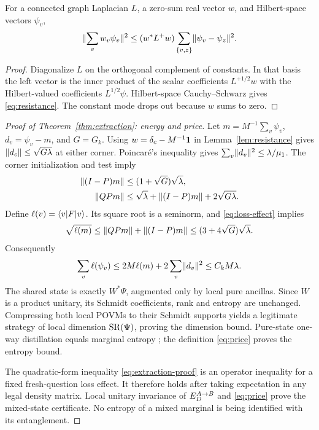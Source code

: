 \begin{lemma}\label{lem:resistance}
For a connected graph Laplacian $L$, a zero-sum real vector $w$,
and Hilbert-space vectors $\psi_v$,
\begin{equation}\label{eq:resistance}
 \lVert\sum_vw_v\psi_v\rVert^2\leq(w^*L^+w)
          \sum_{\{v,z\}}\lVert\psi_v-\psi_z\rVert^2.
\end{equation}
\end{lemma}
\begin{proof}
Diagonalize $L$ on the orthogonal complement of constants. In that
basis the left vector is the inner product of the scalar coefficients
$L^{+1/2}w$ with the Hilbert-valued coefficients $L^{1/2}\psi$.
Hilbert-space Cauchy--Schwarz gives \eqref{eq:resistance}. The constant
mode drops out because $w$ sums to zero.
\end{proof}

\begin{proof}[Proof of Theorem~\ref{thm:extraction}: energy and price]
Let $m=M^{-1}\sum_v\psi_v$, $d_v=\psi_v-m$, and $G=G_k$.
Using $w=\delta_c-M^{-1}\mathbf 1$ in Lemma~\ref{lem:resistance} gives
$\lVert d_c\rVert\leq\sqrt{G\lambda}$ at either corner. Poincar\'e's
inequality gives $\sum_v\lVert d_v\rVert^2\leq\lambda/\mu_1$.
The corner initialization and test imply
\begin{align*}
 \lVert(I-P)m\rVert&\leq(1+\sqrt G)\sqrt\lambda,\\
 \lVert QPm\rVert&\leq\sqrt\lambda+\lVert(I-P)m\rVert+2\sqrt{G\lambda}.
\end{align*}
Define $\ell(v)=\langle v\rvert F\lvert v\rangle$. Its square root is a seminorm,
and \eqref{eq:loss-effect} implies
\[
 \sqrt{\ell(m)}\leq\lVert QPm\rVert+\lVert(I-P)m\rVert
                       \leq(3+4\sqrt G)\sqrt\lambda.
\]
Consequently
\begin{equation}\label{eq:extraction-proof}
 \sum_v\ell(\psi_v)\leq2M\ell(m)+2\sum_v\lVert d_v\rVert^2
            \leq C_kM\lambda.
\end{equation}
The shared state is exactly $W^*\Psi$, augmented only by local pure
ancillas. Since $W$ is a product unitary, its Schmidt coefficients,
rank and entropy are unchanged. Compressing both local POVMs to their
Schmidt supports yields a legitimate strategy of local dimension
$\operatorname{SR}(\Psi)$, proving the dimension bound. Pure-state one-way
distillation equals marginal entropy \cite{bbps}; the definition
\eqref{eq:price} proves the entropy bound.

The quadratic-form inequality \eqref{eq:extraction-proof} is an operator
inequality for a fixed fresh-question loss effect. It therefore holds
after taking expectation in any legal density matrix. Local unitary
invariance of $E_D^{A\to B}$ and \eqref{eq:price} prove the mixed-state
certificate. No entropy of a mixed marginal is being identified with
its entanglement.
\end{proof}

